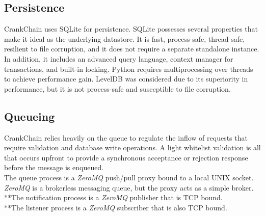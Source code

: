\documentclass[10pt,twocolumn]{article}
\begin{document}
\subsection{Persistence}
CrankChain uses SQLite for persistence.  SQLite possesses several properties that make it ideal as the underlying datastore.  It is fast, process-safe, thread-safe, resilient to file corruption, and it does not require a separate standalone instance.  In addition, it includes an advanced query language, context manager for transactions, and built-in locking.  Python requires multiprocessing over threads to achieve performance gain.  LevelDB was considered due to its superiority in performance, but it is not process-safe and susceptible to file corruption.
\subsection{Queueing}
CrankChain relies heavily on the queue to regulate the inflow of requests that require validation and database write operations.  A light whitelist validation is all that occurs upfront to provide a synchronous acceptance or rejection response before the message is enqueued.\\
The queue process is a \textit{ZeroMQ} push/pull proxy bound to a local UNIX socket.  \textit{ZeroMQ} is a brokerless messaging queue, but the proxy acts as a simple broker\cite{website:zeromqguide}.\\
**The notification process is a \textit{ZeroMQ} publisher that is TCP bound.\\
**The listener process is a \textit{ZeroMQ} subscriber that is also TCP bound.
\end{document}
